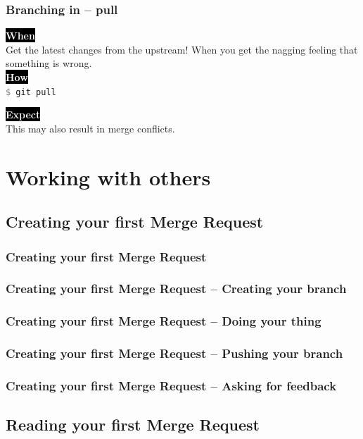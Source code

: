 \documentclass{beamer}
\newcommand{\keyword}[1]{\hspace{-1.0em}\colorbox{black}{\textcolor{white}{\textbf{#1}\vphantom{Ep}}}\vspace{0.2em}} %
\newcommand{\command}[1]{\texttt{\textcolor{gray}{\$} {#1}}}
\begin{document}
\begin{frame}
  \frametitle{Branching in -- pull}
    \keyword{When}\\
    Get the latest changes from the upstream! When you get the nagging feeling
    that something is wrong. \\[1em]

    \keyword{How}\\
    \command{git pull} \\[3em]

    \pause

    \keyword{Expect}\\
    This may also result in \alert{merge conflicts}. \\[1em]
\end{frame}



\section{Working with others}
\subsection{Creating your first Merge Request}

\begin{frame}[fragile]
  \frametitle{Creating your first Merge Request}
\end{frame}

\begin{frame}[fragile]
  \frametitle{Creating your first Merge Request -- Creating your branch}
\end{frame}

\begin{frame}[fragile]
  \frametitle{Creating your first Merge Request -- Doing your thing}
\end{frame}

\begin{frame}[fragile]
  \frametitle{Creating your first Merge Request -- Pushing your branch}
\end{frame}

\begin{frame}[fragile]
  \frametitle{Creating your first Merge Request -- Asking for feedback}
\end{frame}

\subsection{Reading your first Merge Request}
\end{document}

